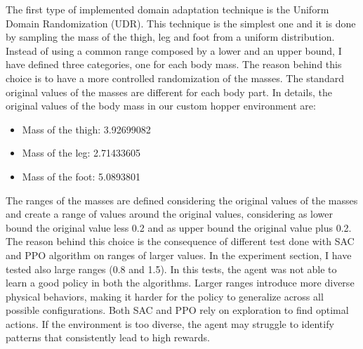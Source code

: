\documentclass[11pt]{article}
\begin{document}
The first type of implemented domain adaptation technique is the Uniform Domain Randomization (UDR). This technique is the simplest one and it is done by sampling the mass of the thigh, leg and foot from a uniform distribution. Instead of using a common range composed by a lower and an upper bound, I have defined three categories, one for each body mass. The reason behind this choice is to have a more controlled randomization of the masses. The standard original values of the masses are different  for each body part. In details, the original values of the body mass in our custom hopper environment are:
\begin{itemize}
    \item Mass of the thigh: 3.92699082
    \item Mass of the leg: 2.71433605
    \item Mass of the foot: 5.0893801
\end{itemize}

The ranges of the masses are defined considering the original values of the masses and create a range of values around the original values, considering as lower bound the original value less 0.2 and as upper bound the original value plus 0.2. The reason behind this choice is the consequence of different test done with SAC and PPO algorithm on ranges of larger values. In the experiment section, I have tested also large ranges (0.8 and 1.5).  In this tests, the agent was not able to learn a good policy in both the algorithms. Larger ranges introduce more diverse physical behaviors, making it harder for the policy to generalize across all possible configurations. Both SAC and PPO rely on exploration to find optimal actions. If the environment is too diverse, the agent may struggle to identify patterns that consistently lead to high rewards.\\
\end{document}

